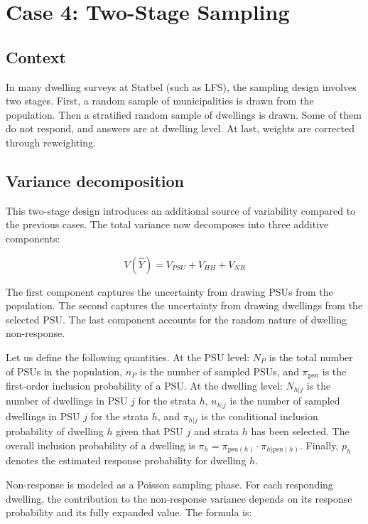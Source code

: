 \documentclass[
]{article}
\begin{document}
\section{Case 4: Two-Stage Sampling}\label{case-4-two-stage-sampling}

\subsection{Context}\label{context-3}

In many dwelling surveys at Statbel (such as LFS), the sampling design
involves two stages. First, a random sample of municipalities is drawn
from the population. Then a stratified random sample of dwellings is
drawn. Some of them do not respond, and answers are at dwelling level.
At last, weights are corrected through reweighting.

\subsection{Variance decomposition}\label{variance-decomposition-3}

This two-stage design introduces an additional source of variability
compared to the previous cases. The total variance now decomposes into
three additive components:

\[V(\hat{Y})=V_{PSU}+V_{HH}+V_{NR}\]

The first component captures the uncertainty from drawing PSUs from the
population. The second captures the uncertainty from drawing dwellings
from the selected PSU. The last component accounts for the random nature
of dwelling non-response.

Let us define the following quantities. At the PSU level: \(N_P\) is the
total number of PSUs in the population, \(n_P\) is the number of sampled
PSUs, and \(\pi_{\text{psu}}\) is the first-order inclusion probability
of a PSU. At the dwelling level: \(N_{h|j}\) is the number of dwellings
in PSU \(j\) for the strata \(h\), \(n_{h|j}\) is the number of sampled
dwellings in PSU \(j\) for the strata \(h\), and \(\pi_{h|j}\) is the
conditional inclusion probability of dwelling \(h\) given that PSU \(j\)
and strata \(h\) has been selected. The overall inclusion probability of
a dwelling is
\(\pi_h = \pi_{\text{psu}(h)} \cdot \pi_{h|\text{psu}(h)}\). Finally,
\(p_h\) denotes the estimated response probability for dwelling \(h\).

Non-response is modeled as a Poisson sampling phase. For each responding
dwelling, the contribution to the non-response variance depends on its
response probability and its fully expanded value. The formula is:
\end{document}
